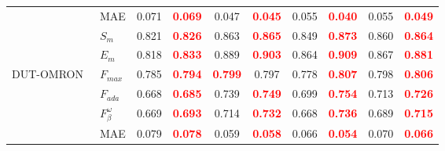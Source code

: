 \documentclass[runningheads]{llncs}
\begin{document}
\begin{table}[H]
{\begin{tabular}{l|l|cc|cc|cc|cc}
                                               & MAE                                                         & 0.071                           & \textcolor{red}{\textbf{0.069}} & 0.047                           & \textcolor{red}{\textbf{0.045}} & 0.055 & \textcolor{red}{\textbf{0.040}} & 0.055                           & \textcolor{red}{\textbf{0.049}} \\
                                               & $S_{m}$                                                     & 0.821                           & \textcolor{red}{\textbf{0.826}} & 0.863                           & \textcolor{red}{\textbf{0.865}} & 0.849 & \textcolor{red}{\textbf{0.873}} & 0.860                           & \textcolor{red}{\textbf{0.864}} \\
                                               & $E_{m}$                                                     & 0.818                           & \textcolor{red}{\textbf{0.833}} & 0.889                           & \textcolor{red}{\textbf{0.903}} & 0.864 & \textcolor{red}{\textbf{0.909}} & 0.867                           & \textcolor{red}{\textbf{0.881}} \\ \hline
   \multirow{6}{*}{DUT-OMRON~\cite{DUT-OMRON}} & $F_{max}$                                                   & 0.785                           & \textcolor{red}{\textbf{0.794}} & \textcolor{red}{\textbf{0.799}} & 0.797                           & 0.778 & \textcolor{red}{\textbf{0.807}} & 0.798                           & \textcolor{red}{\textbf{0.806}} \\
                                               & $F_{ada}$                                                   & 0.668                           & \textcolor{red}{\textbf{0.685}} & 0.739                           & \textcolor{red}{\textbf{0.749}} & 0.699 & \textcolor{red}{\textbf{0.754}} & 0.713                           & \textcolor{red}{\textbf{0.726}} \\
                                               & $F^{\omega}_{\beta}$                                        & 0.669                           & \textcolor{red}{\textbf{0.693}} & 0.714                           & \textcolor{red}{\textbf{0.732}} & 0.668 & \textcolor{red}{\textbf{0.736}} & 0.689                           & \textcolor{red}{\textbf{0.715}} \\
                                               & MAE                                                         & 0.079                           & \textcolor{red}{\textbf{0.078}} & 0.059                           & \textcolor{red}{\textbf{0.058}} & 0.066 & \textcolor{red}{\textbf{0.054}} & 0.070                           & \textcolor{red}{\textbf{0.066}} \\

\end{tabular}}
\end{table}
\end{document}
